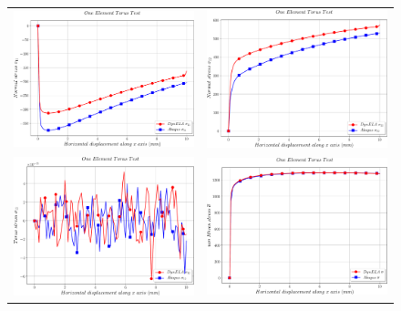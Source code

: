 \begin{figure}[h]
\begin{centering}
\begin{tabular}{cc}
\includegraphics[width=0.45\columnwidth]{Figures/Samples/Element/Torus_stress_11} & \includegraphics[width=0.45\columnwidth]{Figures/Samples/Element/Torus_stress_22}\tabularnewline
\includegraphics[width=0.45\columnwidth]{Figures/Samples/Element/Torus_stress_12} & \includegraphics[width=0.45\columnwidth]{Figures/Samples/Element/Torus_vonMises}\tabularnewline

\end{tabular}
\end{centering}
\end{figure}
